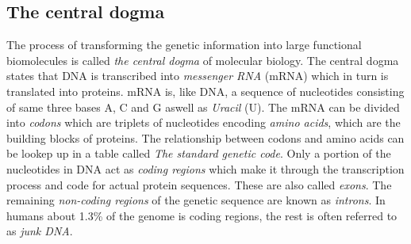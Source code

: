 \documentclass[thesis.tex]{subfiles}
\begin{document}
\subsection{The central dogma}
The process of transforming the genetic information into large functional biomolecules is called \textit{the central dogma} of molecular biology. The central dogma states that DNA is transcribed into \textit{messenger RNA} (mRNA) which in turn is translated into proteins. mRNA is, like DNA, a sequence of nucleotides consisting of same three bases A, C and G aswell as \textit{Uracil} (U). The mRNA can be divided into \textit{codons} which are triplets of nucleotides encoding \textit{amino acids}, which are the building blocks of proteins. The relationship between codons and amino acids can be lookep up in a table called \textit{The standard genetic code}\cite[Chapter 1, p. 6]{introduction_to_genomics}. Only a portion of the nucleotides in DNA act as \textit{coding regions} which make it through the transcription process and code for actual protein sequences. These are also called \textit{exons}. The remaining \textit{non-coding regions} of the genetic sequence are known as \textit{introns}. In humans about 1.3\% of the genome is coding regions\cite[Chapter 4]{introduction_to_genomics}, the rest is often referred to as \textit{junk DNA}.
\end{document}
